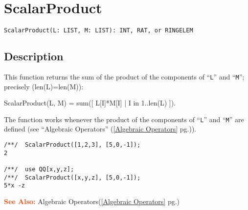 \documentclass[a4paper]{mybook}
\newenvironment{command}{}{} %
\newcommand\SeeAlso{\par\textcolor{OrangeRed}{\textbf{\large See Also: }}}
\begin{document}
\section{ScalarProduct}
\label{ScalarProduct}
\begin{command} %


\begin{Verbatim}[label=syntax, rulecolor=\color{MidnightBlue},
frame=single]
ScalarProduct(L: LIST, M: LIST): INT, RAT, or RINGELEM
\end{Verbatim}


\subsection*{Description}

This function returns the sum of the product of the components of ``\verb&L&''
and ``\verb&M&''; precisely (len(L)=len(M)):
\par 
  ScalarProduct(L, M) = sum([ L[I]*M[I] | I in 1..len(L) ]).
\par 
The function works whenever the product of the components of ``\verb&L&'' and ``\verb&M&''
are defined (see ``Algebraic Operators'' (\ref{Algebraic Operators} pg.\pageref{Algebraic Operators})).
\begin{Verbatim}[label=example, rulecolor=\color{PineGreen}, frame=single]
/**/  ScalarProduct([1,2,3], [5,0,-1]);
2

/**/  use QQ[x,y,z];
/**/  ScalarProduct([x,y,z], [5,0,-1]);
5*x -z
\end{Verbatim}


\SeeAlso %
  Algebraic Operators(\ref{Algebraic Operators} pg.\pageref{Algebraic Operators})
\end{command} %
\end{document}
